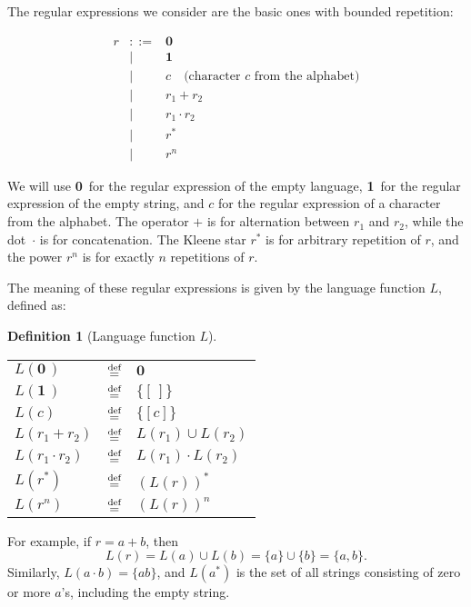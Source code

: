 \documentclass[12pt]{article}
\newtheorem{definition}{Definition} %
\newcommand{\dn}{\ensuremath{\stackrel{\mbox{\scriptsize def}}{=}}}
\newcommand{\ZERO}{\textbf{0}}
\newcommand{\ONE}{\textbf{1}}
\newcommand{\emptylist}{[\,]}
\begin{document}
The regular expressions we consider are the basic ones with bounded repetition:


\[
\begin{array}{rcl}
r &::=& \ZERO  \\
  &\mid& \ONE \\
  &\mid& c \quad\text{(character $c$ from the alphabet)} \\
  &\mid& r_1 + r_2 \\
  &\mid& r_1 \cdot r_2  \\
  &\mid& r^* \\
  &\mid& r^n 
\end{array}
\]


We will use \ZERO\ for the regular expression of the empty language, \ONE\ for
the regular expression of the empty string, and $c$ for the regular expression
of a character from the alphabet. The operator $+$ is for alternation between
$r_1$ and $r_2$, while the dot~$\cdot$ is for concatenation. The Kleene star
$r^\ast$ is for arbitrary repetition of $r$, and the power $r^n$ is for exactly
$n$ repetitions of $r$.


The meaning of these regular expressions is given by the language function $L$, defined as:

\begin{definition}[Language function $L$]\mbox{}

  \renewcommand{\arraystretch}{1.7}
  \begin{tabular}{lcl}
    $L(\ZERO\,)$            & \dn & $\ZERO$ \\
    $L(\ONE\,)$             & \dn & $\{\emptylist\}$ \\
    $L(c)$                  & \dn & $\{[c]\}$ \\
    $L(r_1 + r_2)$          & \dn & $L(r_1) \cup L(r_2)$ \\
    $L(r_1 \cdot r_2)$      & \dn & $L(r_1) \cdot L(r_2)$ \\
    $L(r^\ast)$             & \dn & $(L(r))^\ast$ \\
    $L(r^n)$                & \dn & $(L(r))^n$
  \end{tabular}
  \renewcommand{\arraystretch}{1.0}
\end{definition}


For example, if $r = a + b$, then
\[
L(r) = L(a) \cup L(b) = \{a\} \cup \{b\} = \{a, b\}.
\]
Similarly, $L(a \cdot b) = \{ab\}$, and $L(a^*)$ is the set of all strings
consisting of zero or more $a$'s, including the empty string.
\end{document}
